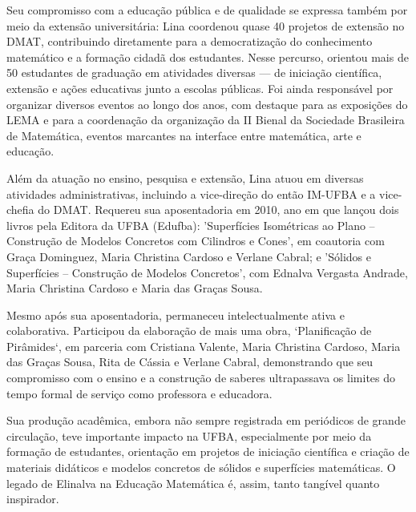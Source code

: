 \documentclass{hipatia}
\begin{document}
Seu compromisso com a educação pública e de qualidade se expressa também por meio da extensão universitária: Lina coordenou quase 40 projetos de extensão no DMAT, contribuindo diretamente para a democratização do conhecimento matemático e a formação cidadã dos estudantes. Nesse percurso, orientou mais de 50 estudantes de graduação em atividades diversas — de iniciação científica, extensão e ações educativas junto a escolas públicas. Foi ainda responsável por organizar diversos eventos ao longo dos anos, com destaque para as exposições do LEMA e para a coordenação da organização da II Bienal da Sociedade Brasileira de Matemática, eventos marcantes na interface entre matemática, arte e educação.  
 

Além da atuação no ensino, pesquisa e extensão, Lina atuou em diversas atividades administrativas, incluindo a vice-direção do então IM-UFBA e a vice-chefia do DMAT. Requereu sua aposentadoria em 2010, ano em que lançou dois livros pela Editora da UFBA (Edufba): 'Superfícies Isométricas ao Plano – Construção de Modelos Concretos com Cilindros e Cones', em coautoria com Graça Dominguez, Maria Christina Cardoso e Verlane Cabral; e 'Sólidos e Superfícies – Construção de Modelos Concretos', com Ednalva Vergasta Andrade, Maria Christina Cardoso e Maria das Graças Sousa. 

Mesmo após sua aposentadoria, permaneceu intelectualmente ativa e colaborativa. Participou da elaboração de mais uma obra, `Planificação de Pirâmides`, em parceria com Cristiana Valente, Maria Christina Cardoso, Maria das Graças Sousa, Rita de Cássia e Verlane Cabral, demonstrando que seu compromisso com o ensino e a construção de saberes ultrapassava os limites do tempo formal de serviço como professora e educadora.  

Sua produção acadêmica, embora não sempre registrada em periódicos de grande circulação, teve importante impacto na UFBA, especialmente por meio da formação de estudantes, orientação em projetos de iniciação científica e criação de materiais didáticos e modelos concretos de sólidos e superfícies matemáticas. O legado de Elinalva na Educação Matemática é, assim, tanto tangível quanto inspirador.  
\end{document}
